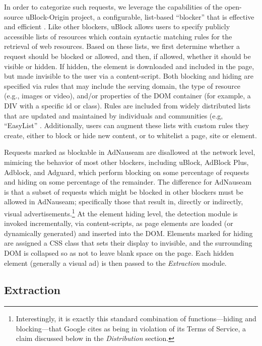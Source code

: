 \documentclass[conference]{IEEEtran}
\begin{document}
In order to categorize such requests, we leverage the capabilities of the open-source uBlock-Origin \cite{Gorhill} project, a configurable, list-based “blocker” that is effective and efficient \cite{Wills}. Like other blockers, uBlock allows users to specify publicly accessible lists of resources which contain syntactic matching rules for the retrieval of web resources. Based on these lists, we first determine whether a request should be blocked or allowed, and then, if allowed, whether it should be visible or hidden. If hidden, the element is downloaded and included in the page, but made invisible to the user via a content-script. Both blocking and hiding are specified via rules that may include the serving domain, the type of resource (e.g., images or video), and/or properties of the DOM container (for example, a DIV with a specific id or class). Rules are included from widely distributed lists that are updated and maintained by individuals and communities (e.g, “EasyList” \cite{EasyList}. Additionally, users can augment these lists with custom rules they create, either to block or hide new content, or to whitelist a page, site or element.

Requests marked as blockable in AdNauseam are disallowed at the network level, mimicing the behavior of most other blockers, including uBlock, AdBlock Plus, Adblock, and Adguard, which perform blocking on some percentage of requests and hiding on some percentage of the remainder. The difference for AdNauseam is that a subset of requests which might be blocked in other blockers must be allowed in AdNauseam; specifically those that result in, directly or indirectly, visual advertisements.\footnote{Interestingly, it is exactly this standard combination of functions---hiding and blocking---that Google cites as being in violation of its Terms of Service, a claim discussed below in the \emph{Distribution} section.} At the element hiding level, the detection module is invoked incrementally, via content-scripts, as page elements are loaded (or dynamically generated) and inserted into the DOM. Elements marked for hiding are assigned a CSS class that sets their display to invisible, and the surrounding DOM is collapsed so as not to leave blank space on the page. Each hidden element (generally a visual ad) is then passed to the \emph{Extraction} module.


\subsection{Extraction}
\end{document}
